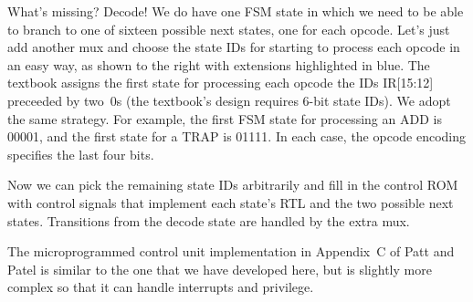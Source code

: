 \begin{minipage}{4.25in}
What's missing?  Decode!  We do have one FSM state in which we need to be
able to branch to one of sixteen possible next states, one for each
opcode.  Let's just add another mux and choose the state IDs for starting
to process each opcode in an easy way, as shown to the right with
extensions highlighted in blue.  The textbook assigns the first state 
for processing each opcode the IDs IR[15:12] preceeded by two~0s (the
textbook's design requires \mbox{6-bit} state IDs).  We adopt the same
strategy.  For example, the first FSM state for processing an ADD is 00001, 
and the first state for a TRAP is 01111.  In each case, the opcode 
encoding specifies the last four bits.\mpline

Now we can pick the remaining state IDs arbitrarily and fill in the 
control ROM with control 
signals that implement each state's RTL and the two possible next states.
Transitions from the decode state are handled by the extra mux.\mpline

The microprogrammed control unit implementation in Appendix~C of 
Patt and Patel is similar to the one that we have developed here,
but is slightly more complex so that it can handle interrupts
and privilege.\\ \\ \\ 
\end{minipage}\hspace{0.25in}%
\begin{minipage}{2in}
\end{minipage}

\vfill

\pagebreak
